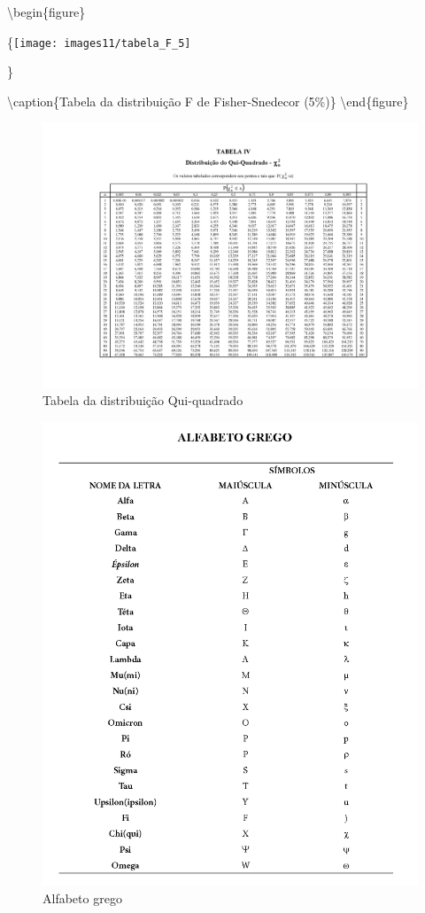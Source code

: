 \documentclass[
]{book}
\begin{document}
\hfill\break

\textbackslash begin\{figure\}

\{\centering \texttt{[image: images11/tabela\_F\_5]}

\}

\textbackslash caption\{Tabela da distribuição F de Fisher-Snedecor (5\%)\}\label{fig:unnamed-chunk-142}
\textbackslash end\{figure\}

\hfill\break

\begin{figure}

{\centering \includegraphics[width=1\linewidth]{images11/Tabela_QuiQuadrado} 

}

\caption{Tabela da distribuição Qui-quadrado}\label{fig:unnamed-chunk-143}
\end{figure}

\hfill\break

\begin{figure}

{\centering \includegraphics[width=0.8\linewidth]{images11/alfabeto_grego} 

}

\caption{Alfabeto grego}\label{fig:unnamed-chunk-144}
\end{figure}

  
\end{document}
